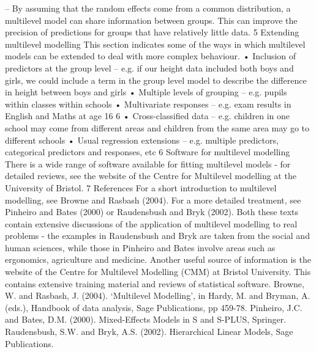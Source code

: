 – By assuming that the random effects come from a common distribution, a
multilevel model can share information between groups. This can improve the
precision of predictions for groups that have relatively little data.
5 Extending multilevel modelling
This section indicates some of the ways in which multilevel models can be extended to
deal with more complex behaviour.
• Inclusion of predictors at the group level
– e.g. if our height data included both boys and girls, we could include a term
in the group level model to describe the difference in height between boys and
girls
• Multiple levels of grouping
– e.g. pupils within classes within schools
• Multivariate responses
– e.g. exam results in English and Maths at age 16
6
• Cross-classified data
– e.g. children in one school may come from different areas and children from
the same area may go to different schools
• Usual regression extensions
– e.g. multiple predictors, categorical predictors and responses, etc
6 Software for multilevel modelling
There is a wide range of software available for fitting multilevel models - for detailed
reviews, see the website of the Centre for Multilevel modelling at the University of Bristol.
7 References
For a short introduction to multilevel modelling, see Browne and Rasbash (2004). For a
more detailed treatment, see Pinheiro and Bates (2000) or Raudensbush and Bryk (2002).
Both these texts contain extensive discussions of the application of multilevel modelling
to real problems - the examples in Raudensbush and Bryk are taken from the social
and human sciences, while those in Pinheiro and Bates involve areas such as ergonomics,
agriculture and medicine.
Another useful source of information is the website of the Centre for Multilevel Modelling
(CMM) at Bristol University. This contains extensive training material and reviews of
statistical software.
Browne, W. and Rasbash, J. (2004). ‘Multilevel Modelling’, in Hardy, M. and
Bryman, A. (eds.), Handbook of data analysis, Sage Publications, pp 459-78.
Pinheiro, J.C. and Bates, D.M. (2000). Mixed-Effects Models in S and S-PLUS,
Springer.
Raudensbush, S.W. and Bryk, A.S. (2002). Hierarchical Linear Models, Sage
Publications.
